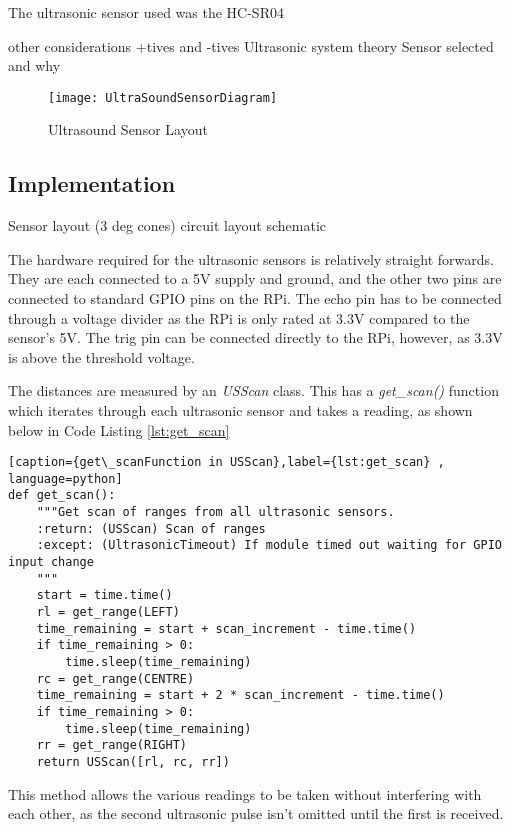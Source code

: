 The ultrasonic sensor used was the HC-SR04

other considerations +tives and -tives
Ultrasonic system theory
Sensor selected and why


\begin{figure}[!ht]
	\centering
	\texttt{[image: UltraSoundSensorDiagram]}
	\caption{Ultrasound Sensor Layout}\label{UltraSoundSensorDiagram}

\end{figure}

\subsection{Implementation}\label{elec/range/impl}
Sensor layout (3 deg cones) 
circuit layout
schematic

The hardware required for the ultrasonic sensors is relatively straight forwards. They are each connected to a 5V supply and ground, and the other two pins are connected to standard GPIO pins on the RPi. The echo pin has to be connected through a voltage divider as the RPi is only rated at 3.3V compared to the sensor's 5V. The trig pin can be connected directly to the RPi, however, as 3.3V is above the threshold voltage.

The distances are measured by an \textit{USScan} class. This has a \textit{get\_scan()} function which iterates through each ultrasonic sensor and takes a reading, as shown below in Code Listing \ref{lst:get_scan}

\begin{lstlisting}[caption={get\_scanFunction in USScan},label={lst:get_scan} , language=python]
def get_scan():
    """Get scan of ranges from all ultrasonic sensors.
    :return: (USScan) Scan of ranges
    :except: (UltrasonicTimeout) If module timed out waiting for GPIO input change
    """
    start = time.time()
    rl = get_range(LEFT)
    time_remaining = start + scan_increment - time.time()
    if time_remaining > 0:
        time.sleep(time_remaining)
    rc = get_range(CENTRE)
    time_remaining = start + 2 * scan_increment - time.time()
    if time_remaining > 0:
        time.sleep(time_remaining)
    rr = get_range(RIGHT)
    return USScan([rl, rc, rr])
\end{lstlisting}

This method allows the various readings to be taken without interfering with each other, as the second ultrasonic pulse isn't omitted until the first is received. 

